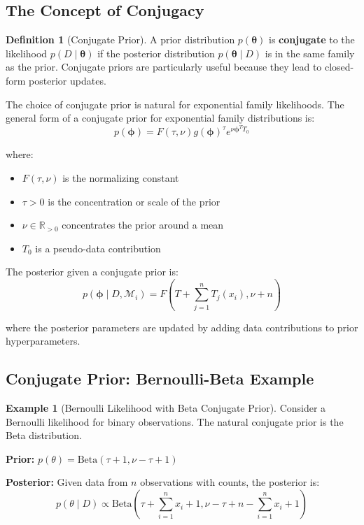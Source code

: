 \documentclass[12pt,a4paper]{article}
\theoremstyle{definition}
\newtheorem{definition}{Definition}[section]
\newtheorem{example}{Example}[section]
\begin{document}
\subsection{The Concept of Conjugacy}

\begin{definition}[Conjugate Prior]
A prior distribution $p(\boldsymbol{\theta})$ is \textbf{conjugate} to the likelihood $p(D \mid \boldsymbol{\theta})$ if the posterior distribution $p(\boldsymbol{\theta} \mid D)$ is in the same family as the prior. Conjugate priors are particularly useful because they lead to closed-form posterior updates.
\end{definition}

The choice of conjugate prior is natural for exponential family likelihoods. The general form of a conjugate prior for exponential family distributions is:
\[
p(\boldsymbol{\phi}) = F(\tau, \nu) g(\boldsymbol{\phi})^{\tau} e^{\nu \boldsymbol{\phi}^T T_0}
\]

where:
\begin{itemize}
    \item $F(\tau, \nu)$ is the normalizing constant
    \item $\tau > 0$ is the concentration or scale of the prior
    \item $\nu \in \mathbb{R}_{>0}$ concentrates the prior around a mean
    \item $T_0$ is a pseudo-data contribution
\end{itemize}

The posterior given a conjugate prior is:
\[
p(\boldsymbol{\phi} \mid D, \mathcal{M}_i) = F(T + \sum_{j=1}^{n} T_j(x_i), \nu + n)
\]

where the posterior parameters are updated by adding data contributions to prior hyperparameters.

\subsection{Conjugate Prior: Bernoulli-Beta Example}

\begin{example}[Bernoulli Likelihood with Beta Conjugate Prior]
Consider a Bernoulli likelihood for binary observations. The natural conjugate prior is the Beta distribution.

\textbf{Prior:} $p(\theta) = \text{Beta}(\tau + 1, \nu - \tau + 1)$

\textbf{Posterior:} Given data from $n$ observations with counts, the posterior is:
\[
p(\theta \mid D) \propto \text{Beta}\left(\tau + \sum_{i=1}^n x_i + 1, \nu - \tau + n - \sum_{i=1}^n x_i + 1\right)
\]
\end{example}
\end{document}
